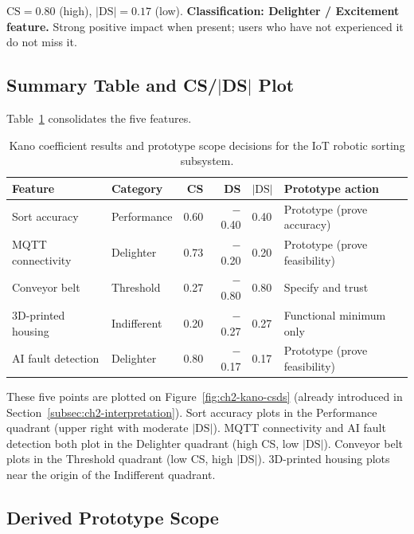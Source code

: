 \noindent
$\mathrm{CS} = 0.80$ (high), $|\mathrm{DS}| = 0.17$ (low).
\textbf{Classification: Delighter / Excitement feature.}
Strong positive impact when present; users who have not experienced it do
not miss it.

\subsection{Summary Table and CS/$|$DS$|$ Plot}
\label{subsec:ch2-ex-summary}

Table~\ref{tab:ch2-results} consolidates the five features.

\begin{table}[htbp]
  \centering
  \caption{Kano coefficient results and prototype scope decisions for the
           IoT robotic sorting subsystem.}
  \label{tab:ch2-results}
  \begin{tabular}{llrrl l}
    \toprule
    Feature & Category & CS & DS & $|\text{DS}|$ & Prototype action \\
    \midrule
    Sort accuracy       & Performance  & 0.60 & $-$0.40 & 0.40 & Prototype (prove accuracy) \\
    MQTT connectivity   & Delighter    & 0.73 & $-$0.20 & 0.20 & Prototype (prove feasibility) \\
    Conveyor belt       & Threshold    & 0.27 & $-$0.80 & 0.80 & Specify and trust \\
    3D-printed housing  & Indifferent  & 0.20 & $-$0.27 & 0.27 & Functional minimum only \\
    AI fault detection  & Delighter    & 0.80 & $-$0.17 & 0.17 & Prototype (prove feasibility) \\
    \bottomrule
  \end{tabular}
\end{table}

\noindent
These five points are plotted on Figure~\ref{fig:ch2-kano-csds} (already
introduced in Section~\ref{subsec:ch2-interpretation}).
Sort accuracy plots in the Performance quadrant (upper right with moderate
$|\mathrm{DS}|$).
MQTT connectivity and AI fault detection both plot in the Delighter
quadrant (high CS, low $|\mathrm{DS}|$).
Conveyor belt plots in the Threshold quadrant (low CS, high
$|\mathrm{DS}|$).
3D-printed housing plots near the origin of the Indifferent quadrant.

\subsection{Derived Prototype Scope}
\label{subsec:ch2-prototype-scope}

